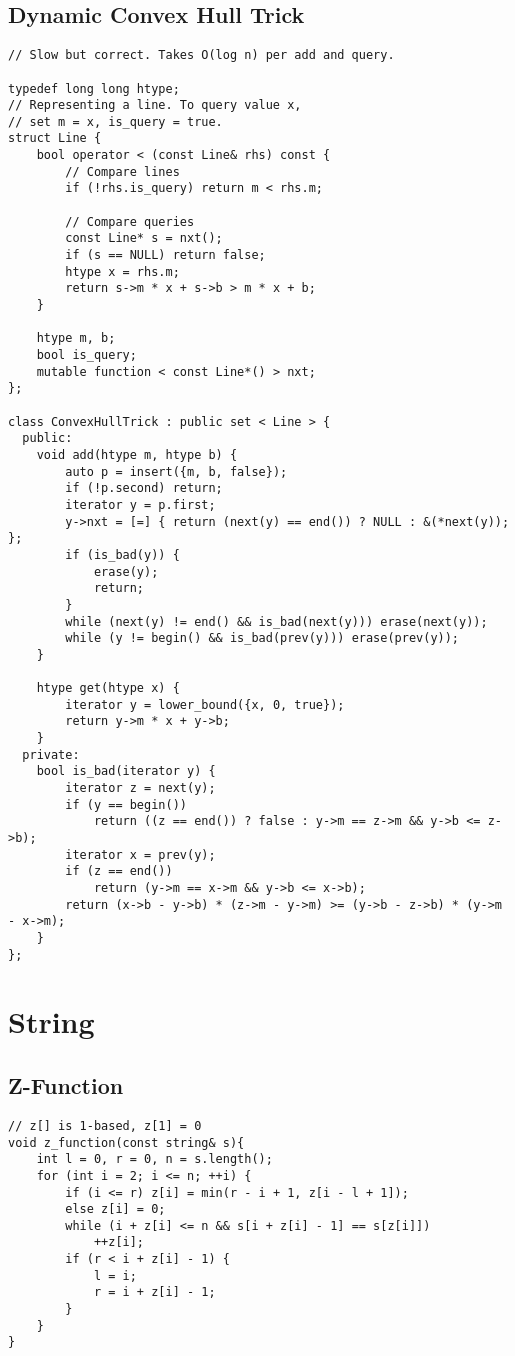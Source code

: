 \documentclass[10pt,landscape]{article}
\begin{document}
\begin{multicols}{2}
\subsection{Dynamic Convex Hull Trick}
\begin{lstlisting}
// Slow but correct. Takes O(log n) per add and query.

typedef long long htype;
// Representing a line. To query value x,
// set m = x, is_query = true.
struct Line {
    bool operator < (const Line& rhs) const {
        // Compare lines
        if (!rhs.is_query) return m < rhs.m;

        // Compare queries
        const Line* s = nxt();
        if (s == NULL) return false;
        htype x = rhs.m;
        return s->m * x + s->b > m * x + b;
    }

    htype m, b;
    bool is_query;
    mutable function < const Line*() > nxt;
};

class ConvexHullTrick : public set < Line > {
  public:
    void add(htype m, htype b) {
        auto p = insert({m, b, false});
        if (!p.second) return;
        iterator y = p.first;
        y->nxt = [=] { return (next(y) == end()) ? NULL : &(*next(y)); };
        if (is_bad(y)) {
            erase(y);
            return;
        }
        while (next(y) != end() && is_bad(next(y))) erase(next(y));
        while (y != begin() && is_bad(prev(y))) erase(prev(y));
    }

    htype get(htype x) {
        iterator y = lower_bound({x, 0, true});
        return y->m * x + y->b;
    }
  private:
    bool is_bad(iterator y) {
        iterator z = next(y);
        if (y == begin())
            return ((z == end()) ? false : y->m == z->m && y->b <= z->b);
        iterator x = prev(y);
        if (z == end())
            return (y->m == x->m && y->b <= x->b);
        return (x->b - y->b) * (z->m - y->m) >= (y->b - z->b) * (y->m - x->m);
    }
};
\end{lstlisting}
\section{String}
\subsection{Z-Function}
\begin{lstlisting}
// z[] is 1-based, z[1] = 0
void z_function(const string& s){
    int l = 0, r = 0, n = s.length();
    for (int i = 2; i <= n; ++i) {
        if (i <= r) z[i] = min(r - i + 1, z[i - l + 1]);
        else z[i] = 0;
        while (i + z[i] <= n && s[i + z[i] - 1] == s[z[i]])
            ++z[i];
        if (r < i + z[i] - 1) {
            l = i;
            r = i + z[i] - 1;
        }
    }
}
\end{lstlisting}

\end{multicols}
\end{document}

